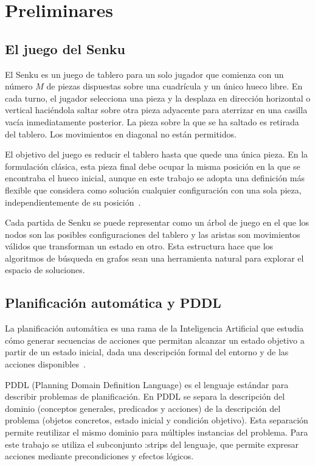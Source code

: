 \documentclass[conference,a4paper]{IEEEtran}
\begin{document}
\section{Preliminares}

\subsection{El juego del Senku}

El Senku es un juego de tablero para un solo jugador que comienza con un
número $M$ de piezas dispuestas sobre una cuadrícula y un único hueco libre.
En cada turno, el jugador selecciona una pieza y la desplaza en dirección
horizontal o vertical haciéndola saltar sobre otra pieza adyacente para
aterrizar en una casilla vacía inmediatamente posterior. La pieza sobre la que
se ha saltado es retirada del tablero. Los movimientos en diagonal no están
permitidos.

El objetivo del juego es reducir el tablero hasta que quede una única pieza.
En la formulación clásica, esta pieza final debe ocupar la misma posición en
la que se encontraba el hueco inicial, aunque en este trabajo se adopta una
definición más flexible que considera como solución cualquier configuración
con una sola pieza, independientemente de su posición~\cite{propuesta-senku}.

Cada partida de Senku se puede representar como un árbol de juego en el que
los nodos son las posibles configuraciones del tablero y las aristas son
movimientos válidos que transforman un estado en otro. Esta estructura hace
que los algoritmos de búsqueda en grafos sean una herramienta natural para
explorar el espacio de soluciones.

\subsection{Planificación automática y PDDL}

La planificación automática es una rama de la Inteligencia Artificial que
estudia cómo generar secuencias de acciones que permitan alcanzar un estado
objetivo a partir de un estado inicial, dada una descripción formal del
entorno y de las acciones disponibles~\cite{ghallab-automated-planning}.

PDDL (Planning Domain Definition Language) es el lenguaje estándar para
describir problemas de planificación. En PDDL se separa la descripción del
dominio (conceptos generales, predicados y acciones) de la descripción del
problema (objetos concretos, estado inicial y condición objetivo). Esta
separación permite reutilizar el mismo dominio para múltiples instancias del
problema. Para este trabajo se utiliza el subconjunto :strips del lenguaje,
que permite expresar acciones mediante precondiciones y efectos lógicos.
\end{document}
